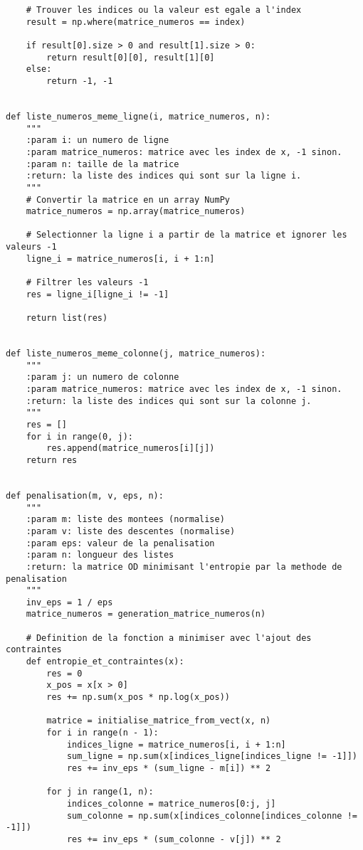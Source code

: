 \documentclass[12pt]{article}
\begin{document}
\begin{lstlisting}
    # Trouver les indices ou la valeur est egale a l'index
    result = np.where(matrice_numeros == index)

    if result[0].size > 0 and result[1].size > 0:
        return result[0][0], result[1][0]
    else:
        return -1, -1


def liste_numeros_meme_ligne(i, matrice_numeros, n):
    """
    :param i: un numero de ligne
    :param matrice_numeros: matrice avec les index de x, -1 sinon.
    :param n: taille de la matrice
    :return: la liste des indices qui sont sur la ligne i.
    """
    # Convertir la matrice en un array NumPy
    matrice_numeros = np.array(matrice_numeros)

    # Selectionner la ligne i a partir de la matrice et ignorer les valeurs -1
    ligne_i = matrice_numeros[i, i + 1:n]

    # Filtrer les valeurs -1
    res = ligne_i[ligne_i != -1]

    return list(res)


def liste_numeros_meme_colonne(j, matrice_numeros):
    """
    :param j: un numero de colonne
    :param matrice_numeros: matrice avec les index de x, -1 sinon.
    :return: la liste des indices qui sont sur la colonne j.
    """
    res = []
    for i in range(0, j):
        res.append(matrice_numeros[i][j])
    return res


def penalisation(m, v, eps, n):
    """
    :param m: liste des montees (normalise)
    :param v: liste des descentes (normalise)
    :param eps: valeur de la penalisation
    :param n: longueur des listes
    :return: la matrice OD minimisant l'entropie par la methode de penalisation
    """
    inv_eps = 1 / eps
    matrice_numeros = generation_matrice_numeros(n)

    # Definition de la fonction a minimiser avec l'ajout des contraintes
    def entropie_et_contraintes(x):
        res = 0
        x_pos = x[x > 0]
        res += np.sum(x_pos * np.log(x_pos))

        matrice = initialise_matrice_from_vect(x, n)
        for i in range(n - 1):
            indices_ligne = matrice_numeros[i, i + 1:n]
            sum_ligne = np.sum(x[indices_ligne[indices_ligne != -1]])
            res += inv_eps * (sum_ligne - m[i]) ** 2

        for j in range(1, n):
            indices_colonne = matrice_numeros[0:j, j]
            sum_colonne = np.sum(x[indices_colonne[indices_colonne != -1]])
            res += inv_eps * (sum_colonne - v[j]) ** 2


\end{lstlisting}
\end{document}
